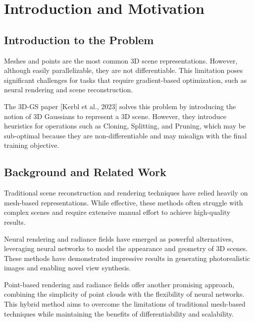 \documentclass[11pt]{report}
\title{\titleinfo}
\author{\authorinfo}
\date{}
\begin{document}
\maketitle
\thispagestyle{empty} %

\tableofcontents

\chapter{Introduction and Motivation}
\section{Introduction to the Problem}
Meshes and points are the most common 3D scene representations. However, although easily parallelizable, they are not differentiable. This limitation poses significant challenges for tasks that require gradient-based optimization, such as neural rendering and scene reconstruction.

The 3D-GS paper [Kerbl et al., 2023] solves this problem by introducing the notion of 3D Gaussians to represent a 3D scene. However, they introduce heuristics for operations such as Cloning, Splitting, and Pruning, which may be sub-optimal because they are non-differentiable and may misalign with the final training objective.

\section{Background and Related Work}
Traditional scene reconstruction and rendering techniques have relied heavily on mesh-based representations. While effective, these methods often struggle with complex scenes and require extensive manual effort to achieve high-quality results.

Neural rendering and radiance fields have emerged as powerful alternatives, leveraging neural networks to model the appearance and geometry of 3D scenes. These methods have demonstrated impressive results in generating photorealistic images and enabling novel view synthesis.

Point-based rendering and radiance fields offer another promising approach, combining the simplicity of point clouds with the flexibility of neural networks. This hybrid method aims to overcome the limitations of traditional mesh-based techniques while maintaining the benefits of differentiability and scalability.
\end{document}
